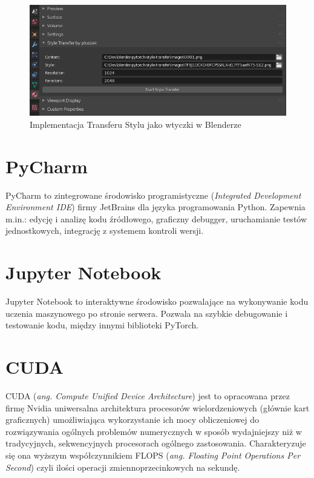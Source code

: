 \documentclass[brudnopis]{xmgr}
\begin{document}
\begin{figure}[!tbh]
\centering
\includegraphics[width=.8\hsize]{fig/9}
\caption{Implementacja Transferu Stylu jako wtyczki w Blenderze\label{RYS.9}}
\end{figure}

\section{PyCharm\label{s:dsssl}}
 PyCharm to zintegrowane środowisko programistyczne (\textit{Integrated Development Environment IDE}) firmy JetBrains dla języka programowania Python. Zapewnia m.in.: edycję i analizę kodu źródłowego, graficzny debugger, uruchamianie testów jednostkowych, integrację z systemem kontroli wersji. 
 
 \section{Jupyter Notebook\label{s:dsssl}}
 
Jupyter Notebook to interaktywne środowisko pozwalające na wykonywanie kodu uczenia maszynowego po stronie serwera. Pozwala na szybkie debugowanie i testowanie kodu, między innymi biblioteki PyTorch.

 \section{CUDA\label{s:dsssl}}
 
CUDA (\textit{ang. Compute Unified Device Architecture}) jest to opracowana przez firmę Nvidia uniwersalna architektura procesorów wielordzeniowych (głównie kart graficznych) umożliwiająca wykorzystanie ich mocy obliczeniowej do rozwiązywania ogólnych problemów numerycznych w sposób wydajniejszy niż w tradycyjnych, sekwencyjnych procesorach ogólnego zastosowania. Charakteryzuje się ona wyższym współczynnikiem FLOPS (\textit{ang. Floating Point Operations Per Second}) czyli ilości operacji zmiennoprzecinkowych na sekundę.
\end{document}
